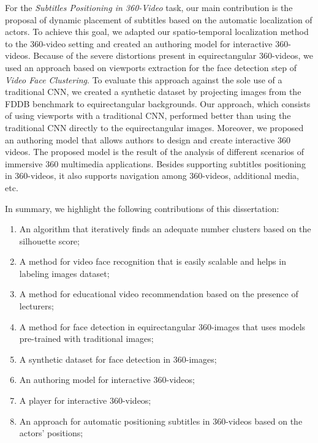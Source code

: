 For the \emph{Subtitles Positioning in 360-Video} task, our main contribution is the proposal of dynamic placement of subtitles based on the automatic localization of actors. To achieve this goal, we adapted our spatio-temporal localization method to the 360-video setting and created an authoring model for interactive 360-videos. Because of the severe distortions present in equirectangular 360-videos, we used an approach based on viewports extraction for the face detection step of \emph{Video Face Clustering}. To evaluate this approach against the sole use of a traditional CNN, we created a synthetic dataset by projecting images from the FDDB benchmark to equirectangular backgrounds. Our approach, which consists of using viewports with a traditional CNN, performed better than using the traditional CNN directly to the equirectangular images. Moreover, we proposed an authoring model that allows authors to design and create interactive 360 videos. The proposed model is the result of the analysis of different scenarios of immersive 360 multimedia applications. Besides supporting subtitles positioning in 360-videos, it also supports navigation among 360-videos, additional media, etc. 

In summary, we highlight the following contributions of this dissertation:
\begin{enumerate}
    \item An algorithm that iteratively finds an adequate number clusters based on the silhouette score;
    \item A method for video face recognition that is easily scalable and helps in labeling images dataset;
    \item A method for educational video recommendation based on the presence of lecturers;
    \item A method for face detection in equirectangular 360-images that uses models pre-trained with traditional images;
    \item A synthetic dataset for face detection in 360-images;
    \item An authoring model for interactive 360-videos;
    \item A player for interactive 360-videos;
    \item An approach for automatic positioning subtitles in 360-videos based on the actors' positions;
\end{enumerate}

